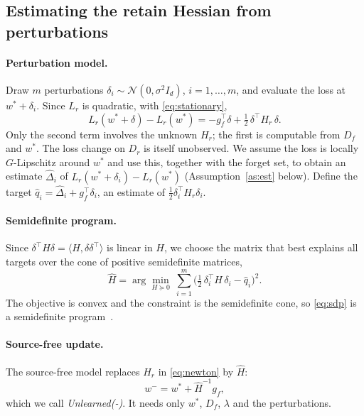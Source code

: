 \documentclass[10pt,twocolumn,letterpaper]{article}
\begin{document}
\subsection{Estimating the retain Hessian from perturbations}
\label{sec:hessian}
\paragraph{Perturbation model.}
Draw $m$ perturbations $\delta_i\sim\mathcal{N}(0,\sigma^2 I_d)$, $i=1,\dots,m$, and evaluate the loss at $w^*+\delta_i$.
Since $L_r$ is quadratic, with \cref{eq:stationary},
\begin{equation}
  L_r(w^*+\delta)-L_r(w^*)=-g_f^{\top}\delta+\tfrac12\,\delta^{\top}H_r\,\delta .
  \label{eq:quad}
\end{equation}
Only the second term involves the unknown $H_r$; the first is computable from $D_f$ and $w^*$.
The loss change on $D_r$ is itself unobserved.
We assume the loss is locally $G$-Lipschitz around $w^*$ and use this, together with the forget set, to obtain an estimate $\widehat{\Delta}_i$ of $L_r(w^*+\delta_i)-L_r(w^*)$ (Assumption~\ref{as:est} below).
Define the target $\hat q_i=\widehat\Delta_i+g_f^{\top}\delta_i$, an estimate of $\tfrac12\delta_i^\top H_r\delta_i$.

\paragraph{Semidefinite program.}
Since $\delta^\top H\delta=\langle H,\delta\delta^\top\rangle$ is linear in $H$, we choose the matrix that best explains all targets over the cone of positive semidefinite matrices,
\begin{equation}
  \widehat H=\arg\min_{H\succeq 0}\ \sum_{i=1}^{m}\Big(\tfrac12\,\delta_i^{\top}H\,\delta_i-\hat q_i\Big)^2 .
  \label{eq:sdp}
\end{equation}
The objective is convex and the constraint is the semidefinite cone, so \cref{eq:sdp} is a semidefinite program~\cite{vandenberghe1996,boyd2004}.

\paragraph{Source-free update.}
The source-free model replaces $H_r$ in \cref{eq:newton} by $\widehat H$:
\begin{equation}
  w^{-}=w^*+\widehat H^{-1}g_f ,
  \label{eq:unlearn}
\end{equation}
which we call \emph{Unlearned(-)}.
It needs only $w^*$, $D_f$, $\lambda$ and the perturbations.
\end{document}
